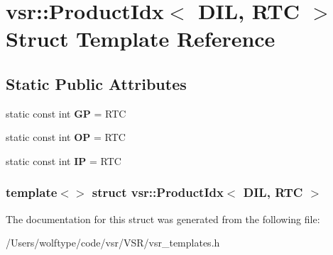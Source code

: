 \hypertarget{structvsr_1_1_product_idx_3_01_d_i_l_00_01_r_t_c_01_4}{\section{vsr\-:\-:Product\-Idx$<$ D\-I\-L, R\-T\-C $>$ Struct Template Reference}
\label{structvsr_1_1_product_idx_3_01_d_i_l_00_01_r_t_c_01_4}
}
\subsection*{Static Public Attributes}
\begin{DoxyCompactItemize}
\item 
\hypertarget{structvsr_1_1_product_idx_3_01_d_i_l_00_01_r_t_c_01_4_adc99c64966e5df1dfe6e8b76fb880c74}{static const int {\bfseries G\-P} = R\-T\-C}\label{structvsr_1_1_product_idx_3_01_d_i_l_00_01_r_t_c_01_4_adc99c64966e5df1dfe6e8b76fb880c74}

\item 
\hypertarget{structvsr_1_1_product_idx_3_01_d_i_l_00_01_r_t_c_01_4_a7c99e07c3086d8aae6e2be89f7aaa677}{static const int {\bfseries O\-P} = R\-T\-C}\label{structvsr_1_1_product_idx_3_01_d_i_l_00_01_r_t_c_01_4_a7c99e07c3086d8aae6e2be89f7aaa677}

\item 
\hypertarget{structvsr_1_1_product_idx_3_01_d_i_l_00_01_r_t_c_01_4_a5a27c6354effcee10dcc451caa9201c9}{static const int {\bfseries I\-P} = R\-T\-C}\label{structvsr_1_1_product_idx_3_01_d_i_l_00_01_r_t_c_01_4_a5a27c6354effcee10dcc451caa9201c9}

\end{DoxyCompactItemize}
\subsubsection*{template$<$$>$ struct vsr\-::\-Product\-Idx$<$ D\-I\-L, R\-T\-C $>$}



The documentation for this struct was generated from the following file\-:\begin{DoxyCompactItemize}
\item 
/\-Users/wolftype/code/vsr/\-V\-S\-R/vsr\-\_\-templates.\-h\end{DoxyCompactItemize}
